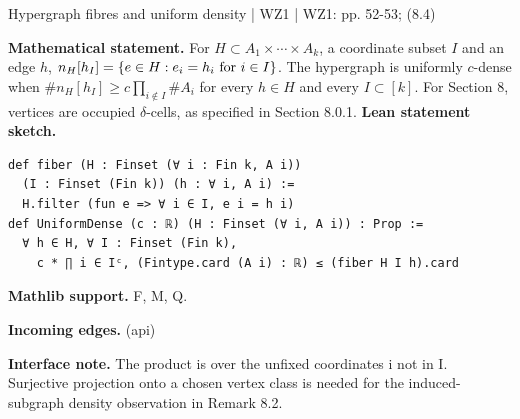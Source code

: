 \documentclass[10pt,a4paper]{article}
\newcommand{\nodecard}[1]{\hyperlink{node-#1}{\texttt{\detokenize{#1}}}}
\begin{document}
\begin{minipage}{\linewidth}
\hypertarget{node-Dhyp}{}
\begin{tcolorbox}[colback=white,colframe=radialfg,colbacktitle=radialbg,coltitle=ink,boxrule=0.45pt,arc=1.6mm,left=3mm,right=3mm,top=2mm,bottom=2mm,title={\sffamily\bfseries WZ1 Definitions 8.2-8.4 \hfill \texttt{Dhyp}}]
{\sffamily\small\color{muted}Hypergraph fibres and uniform density | WZ1 | WZ1: pp. 52-53; (8.4)}\par
\textbf{Mathematical statement.} For $H\subset A_1\times\cdots\times A_k$, a coordinate subset $I$ and an edge $h$,
$n_H[h_I]=\{e\in H:e_i=h_i\ {\rm for}\ i\in I\}$.
The hypergraph is uniformly $c$-dense when
$\#n_H[h_I]\ge c\prod_{i\notin I}\#A_i$
for every $h\in H$ and every $I\subset[k]$.
For Section 8, vertices are occupied $\delta$-cells, as specified in Section 8.0.1.
\smallskip\textbf{Lean statement sketch.}
\begin{Verbatim}[fontsize=\small,breaklines=true,breakanywhere=true,tabsize=2]
def fiber (H : Finset (∀ i : Fin k, A i))
  (I : Finset (Fin k)) (h : ∀ i, A i) :=
  H.filter (fun e => ∀ i ∈ I, e i = h i)
def UniformDense (c : ℝ) (H : Finset (∀ i, A i)) : Prop :=
  ∀ h ∈ H, ∀ I : Finset (Fin k),
    c * ∏ i ∈ Iᶜ, (Fintype.card (A i) : ℝ) ≤ (fiber H I h).card
\end{Verbatim}
{\footnotesize\textbf{Mathlib support.} F, M, Q.\par
\textbf{Incoming edges.} \nodecard{Imass} (api)\par}
{\footnotesize\textbf{Interface note.} The product is over the unfixed coordinates i not in I. Surjective projection onto a chosen vertex class is needed for the induced-subgraph density observation in Remark 8.2.}
\end{tcolorbox}\end{minipage}\par\medskip
\end{document}

